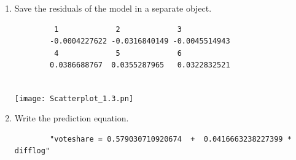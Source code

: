 \documentclass[12pt,letterpaper]{article}
\begin{document}
\begin{enumerate}
		\item Save the residuals of the model in a separate object.	
		  
	
			\begin{verbatim}
		 1             2             3            
		-0.0004227622 -0.0316840149 -0.0045514943  
		 4             5             6 
		0.0386688767  0.0355287965   0.0322832521 
		
			\end{verbatim}	
		\texttt{[image: Scatterplot\_1.3.pn]}
		\item Write the prediction equation.
		  
		\begin{verbatim}
		"voteshare = 0.579030710920674  +  0.0416663238227399 * difflog"
	\end{verbatim}	
	\end{enumerate}
	
\newpage
\end{document}
